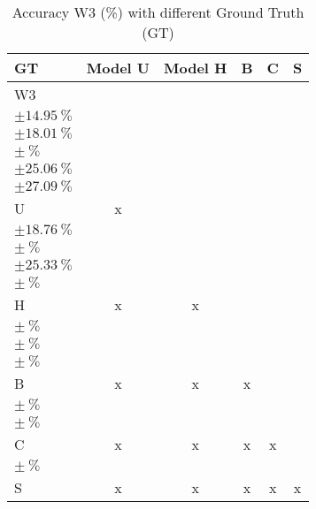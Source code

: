 \begin{table}[H]
\small
\centering
\caption{\label{tab:base3dRPEdatamask}%
  Accuracy W3 (\%) with different Ground Truth (GT)
}
\begin{tabular}{lccccc}
  \toprule
  GT & Model U                                                         & Model H                                                         & B                                                     & C                                                               & S \\
  \midrule
  W3 & \makecell{$\SI{83.97}{\percent}$ \\ $\pm \SI{14.95}{\percent}$} & \makecell{$\SI{22.57}{\percent}$ \\ $\pm \SI{18.01}{\percent}$} & \makecell{$\SI{}{\percent}$ \\ $\pm \SI{}{\percent}$} & \makecell{$\SI{49.53}{\percent}$ \\ $\pm \SI{25.06}{\percent}$} & \makecell{$\SI{30.18}{\percent}$ \\ $\pm \SI{27.09}{\percent}$} \\
  U & x                                                                & \makecell{$\SI{23.91}{\percent}$ \\ $\pm \SI{18.76}{\percent}$} & \makecell{$\SI{}{\percent}$ \\ $\pm \SI{}{\percent}$} & \makecell{$\SI{51.75}{\percent}$ \\ $\pm \SI{25.33}{\percent}$} & \makecell{$\SI{}{\percent}$ \\ $\pm \SI{}{\percent}$} \\
  H & x                                                                & x                                                     & \makecell{$\SI{}{\percent}$ \\ $\pm \SI{}{\percent}$} & \makecell{$\SI{}{\percent}$ \\ $\pm \SI{}{\percent}$} & \makecell{$\SI{}{\percent}$ \\ $\pm \SI{}{\percent}$} \\
  B & x                                                                & x                                                     & x                                                     & \makecell{$\SI{}{\percent}$ \\ $\pm \SI{}{\percent}$} & \makecell{$\SI{}{\percent}$ \\ $\pm \SI{}{\percent}$} \\
  C & x                                                                & x                                                     & x                                                     & x                                                     & \makecell{$\SI{}{\percent}$ \\ $\pm \SI{}{\percent}$} \\
  S & x                                                                & x                                                     & x                                                     & x                                                     & x \\
  \bottomrule
\end{tabular}
\end{table}


